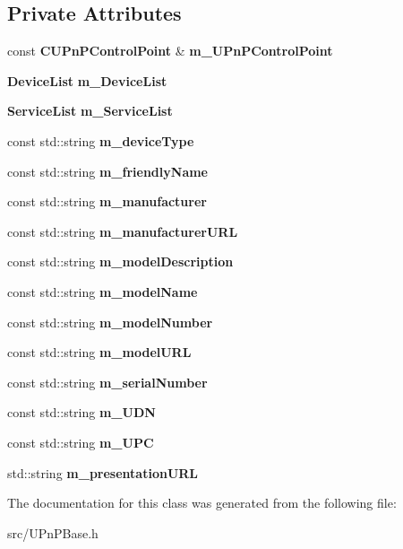 \subsection*{Private Attributes}
\begin{DoxyCompactItemize}
\item 
const {\bf CUPnPControlPoint} \& {\bfseries m\_\-UPnPControlPoint}\label{classCUPnPDevice_aea81bdb2a74bd33a379b34e1a012fd40}

\item 
{\bf DeviceList} {\bfseries m\_\-DeviceList}\label{classCUPnPDevice_ae677b360d4295fa72520044e17531ca3}

\item 
{\bf ServiceList} {\bfseries m\_\-ServiceList}\label{classCUPnPDevice_aa665952887991437af4cbdf4d75eb754}

\item 
const std::string {\bfseries m\_\-deviceType}\label{classCUPnPDevice_a0446182b647ef57fcc7201f03cedf069}

\item 
const std::string {\bfseries m\_\-friendlyName}\label{classCUPnPDevice_ad16c5d6cb390812bfd329d394f26ca7e}

\item 
const std::string {\bfseries m\_\-manufacturer}\label{classCUPnPDevice_a5e23c06e5a3c0daf183bbcebdfec4689}

\item 
const std::string {\bfseries m\_\-manufacturerURL}\label{classCUPnPDevice_a628a7953fbcaaf717f9a3aef6220d41e}

\item 
const std::string {\bfseries m\_\-modelDescription}\label{classCUPnPDevice_a5e846142c0809b5d331229ab05fc1e2c}

\item 
const std::string {\bfseries m\_\-modelName}\label{classCUPnPDevice_a567e9f6e2d3bce9b69da4c9cc91b9978}

\item 
const std::string {\bfseries m\_\-modelNumber}\label{classCUPnPDevice_a1ab68e0da53ea8e2048d4f9fbe142603}

\item 
const std::string {\bfseries m\_\-modelURL}\label{classCUPnPDevice_ac125676601974d7892f907f8b9b4dc84}

\item 
const std::string {\bfseries m\_\-serialNumber}\label{classCUPnPDevice_ae316f16b199e917974cd581c87df8a70}

\item 
const std::string {\bfseries m\_\-UDN}\label{classCUPnPDevice_a26cb726754305dcb370ea9417ff66e5d}

\item 
const std::string {\bfseries m\_\-UPC}\label{classCUPnPDevice_a215f64210022b1c1a4de74558d1f34bc}

\item 
std::string {\bfseries m\_\-presentationURL}\label{classCUPnPDevice_a64053e3b2a64417e12e677d7279b9b77}

\end{DoxyCompactItemize}


The documentation for this class was generated from the following file:\begin{DoxyCompactItemize}
\item 
src/UPnPBase.h\end{DoxyCompactItemize}
